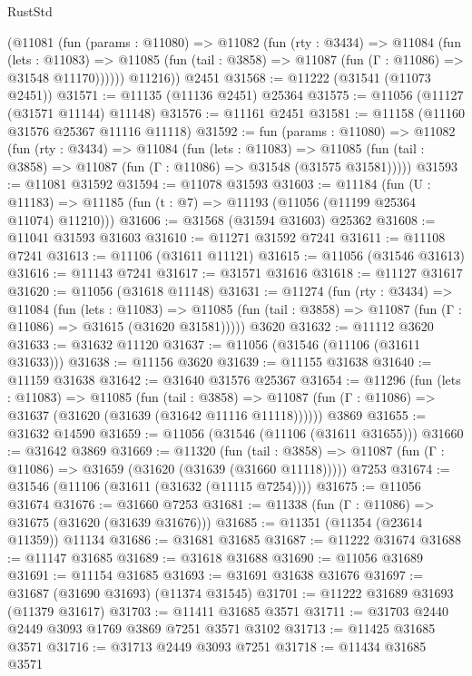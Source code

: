 \begin{lexlean}{RustStd}
\begin{coremodule}
        (@11081
          (fun (params : @11080) =>
          @11082
            (fun (rty : @3434) =>
            @11084
              (fun (lets : @11083) =>
              @11085 (fun (tail : @3858) => @11087 (fun (Γ : @11086) => @31548 @11170))))))
        @11216))
    @2451
@31568 := @11222 (@31541 (@11073 @2451))
@31571 := @11135 (@11136 @2451) @25364
@31575 := @11056 (@11127 (@31571 @11144) @11148)
@31576 := @11161 @2451
@31581 := @11158 (@11160 @31576 @25367 @11116 @11118)
@31592 := fun (params : @11080) =>
  @11082
    (fun (rty : @3434) =>
    @11084
      (fun (lets : @11083) =>
      @11085 (fun (tail : @3858) => @11087 (fun (Γ : @11086) => @31548 (@31575 @31581)))))
@31593 := @11081 @31592
@31594 := @11078 @31593
@31603 := @11184
    (fun (U : @11183) => @11185 (fun (t : @7) => @11193 (@11056 (@11199 @25364 @11074) @11210)))
@31606 := @31568 (@31594 @31603) @25362
@31608 := @11041 @31593 @31603
@31610 := @11271 @31592 @7241
@31611 := @11108 @7241
@31613 := @11106 (@31611 @11121)
@31615 := @11056 (@31546 @31613)
@31616 := @11143 @7241
@31617 := @31571 @31616
@31618 := @11127 @31617
@31620 := @11056 (@31618 @11148)
@31631 := @11274
    (fun (rty : @3434) =>
    @11084
      (fun (lets : @11083) =>
      @11085 (fun (tail : @3858) => @11087 (fun (Γ : @11086) => @31615 (@31620 @31581)))))
    @3620
@31632 := @11112 @3620
@31633 := @31632 @11120
@31637 := @11056 (@31546 (@11106 (@31611 @31633)))
@31638 := @11156 @3620
@31639 := @11155 @31638
@31640 := @11159 @31638
@31642 := @31640 @31576 @25367
@31654 := @11296
    (fun (lets : @11083) =>
    @11085
      (fun (tail : @3858) =>
      @11087 (fun (Γ : @11086) => @31637 (@31620 (@31639 (@31642 @11116 @11118))))))
    @3869
@31655 := @31632 @14590
@31659 := @11056 (@31546 (@11106 (@31611 @31655)))
@31660 := @31642 @3869
@31669 := @11320
    (fun (tail : @3858) => @11087 (fun (Γ : @11086) => @31659 (@31620 (@31639 (@31660 @11118)))))
    @7253
@31674 := @31546 (@11106 (@31611 (@31632 (@11115 @7254))))
@31675 := @11056 @31674
@31676 := @31660 @7253
@31681 := @11338 (fun (Γ : @11086) => @31675 (@31620 (@31639 @31676)))
@31685 := @11351 (@11354 (@23614 @11359)) @11134
@31686 := @31681 @31685
@31687 := @11222 @31674
@31688 := @11147 @31685
@31689 := @31618 @31688
@31690 := @11056 @31689
@31691 := @11154 @31685
@31693 := @31691 @31638 @31676
@31697 := @31687 (@31690 @31693) (@11374 @31545)
@31701 := @11222 @31689 @31693 (@11379 @31617)
@31703 := @11411 @31685 @3571
@31711 := @31703 @2440 @2449 @3093 @1769 @3869 @7251 @3571 @3102
@31713 := @11425 @31685 @3571
@31716 := @31713 @2449 @3093 @7251
@31718 := @11434 @31685 @3571

\end{coremodule}
\end{lexlean}
